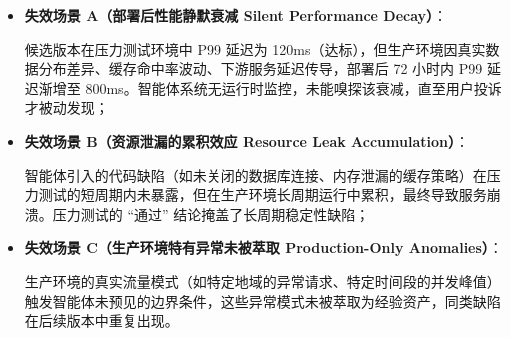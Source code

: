 \begin{itemize}
\item
  \textbf{失效场景 A（部署后性能静默衰减 Silent Performance Decay）}：

  候选版本在压力测试环境中 P99 延迟为
  120ms（达标），但生产环境因真实数据分布差异、缓存命中率波动、下游服务延迟传导，部署后
  72 小时内 P99 延迟渐增至
  800ms。智能体系统无运行时监控，未能嗅探该衰减，直至用户投诉才被动发现；
\item
  \textbf{失效场景 B（资源泄漏的累积效应 Resource Leak Accumulation）}：

  智能体引入的代码缺陷（如未关闭的数据库连接、内存泄漏的缓存策略）在压力测试的短周期内未暴露，但在生产环境长周期运行中累积，最终导致服务崩溃。压力测试的
  ``通过'' 结论掩盖了长周期稳定性缺陷；
\item
  \textbf{失效场景 C（生产环境特有异常未被萃取 Production-Only
  Anomalies）}：

  生产环境的真实流量模式（如特定地域的异常请求、特定时间段的并发峰值）触发智能体未预见的边界条件，这些异常模式未被萃取为经验资产，同类缺陷在后续版本中重复出现。

\begin{Shaded}
\begin{Highlighting}[]






\end{Highlighting}
\end{Shaded}
\end{itemize}
